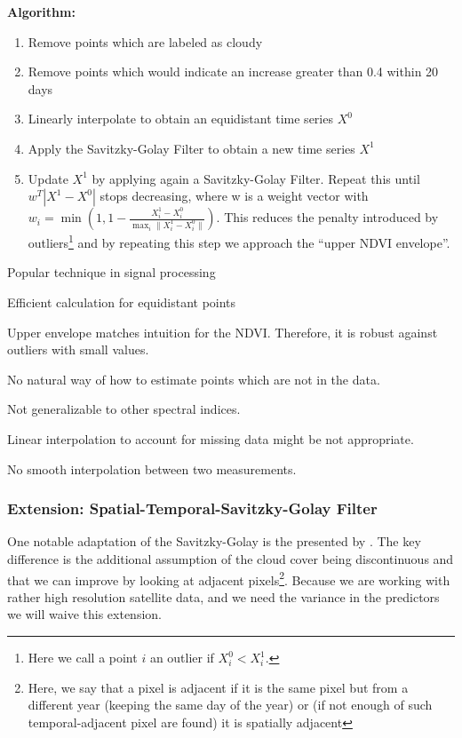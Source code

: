 \textbf{Algorithm:}
\begin{enumerate}
  \item Remove points which are labeled as cloudy
  \item Remove points which would indicate an increase greater than 0.4 within 20 days
  \item Linearly interpolate to obtain an equidistant time series $X^0$
  \item Apply the Savitzky-Golay Filter to obtain a new time series $X^1$
  \item Update $X^1$ by applying again a Savitzky-Golay Filter. Repeat this until $w^T |X^1-X^0|$ stops decreasing, where w is a weight vector with $w_i = \min\left(1, 1 - \frac{X^1_i-X^0_i}{\max_i\|X^1_i-X^0_i\|}\right)$. This reduces the penalty introduced by outliers\footnote{Here we call a point $i$ an outlier if $X^0_i<X^1_i$.} and by repeating this step we approach the ``upper NDVI envelope''.
\end{enumerate}

\begin{my_pros_cons_table}{
    \item Popular technique in signal processing
    \item Efficient calculation for equidistant points
    \item Upper envelope matches intuition for the NDVI. Therefore, it is robust against outliers with small values.
  }{
    \item No natural way of how to estimate points which are not in the data.
    \item Not generalizable to other spectral indices.
    \item Linear interpolation to account for missing data might be not appropriate.
    \item No smooth interpolation between two measurements.
  }
\end{my_pros_cons_table}


\subsubsection*{Extension: Spatial-Temporal-Savitzky-Golay Filter}
One notable adaptation of the Savitzky-Golay is the presented by \cite{caoSimpleMethodImprove2018b}. The key difference is the additional assumption of the cloud cover being discontinuous and that we can improve by looking at adjacent pixels\footnote{Here, we say that a pixel is adjacent if it is the same pixel but from a different year (keeping the same day of the year) or (if not enough of such temporal-adjacent pixel are found) it is spatially adjacent}. Because we are working with rather high resolution satellite data, and we need the variance in the predictors we will waive this extension.


